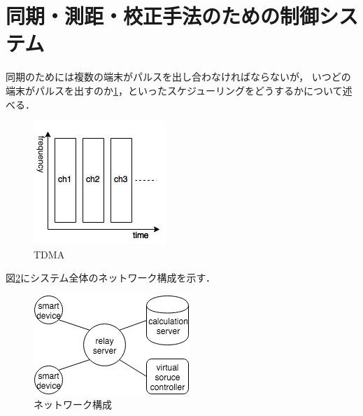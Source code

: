 
\section{同期・測距・校正手法のための制御システム}
同期のためには複数の端末がパルスを出し合わなければならないが，
いつどの端末がパルスを出すのか\ref{fig:TDMA}，といったスケジューリングをどうするかについて述べる．

\begin{figure}[p]\centering
  \hspace{-2mm}\includegraphics[clip,width=1.1\hsize]{img/TDMA.png}
  \caption{TDMA}\label{fig:TDMA}
\end{figure}

図\ref{fig:network2}にシステム全体のネットワーク構成を示す．

\begin{figure}[p]\centering
  \hspace{-2mm}\includegraphics[clip,width=1.1\hsize]{img/network2.png}
  \caption{ネットワーク構成}\label{fig:network2}
\end{figure}

